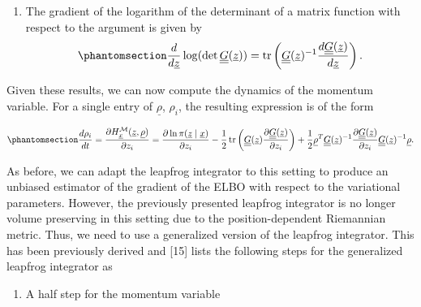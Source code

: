 \documentclass[
]{scrartcl}
\providecommand{\tightlist}{%
  \setlength{\itemsep}{0pt}\setlength{\parskip}{0pt}}
\begin{document}
\begin{refsection}
\begin{enumerate}
\def\labelenumi{\arabic{enumi}.}
\setcounter{enumi}{2}
\tightlist
\item
  The gradient of the logarithm of the determinant of a matrix function
  with respect to the argument is given by
  \begin{equation}\phantomsection\label{eq-gradient-log-determinant-matrix}{  
  \frac{d}{d \underline{z}} 
  \log (\operatorname{det} \underline{\underline{G}}(\underline{z})) = 
  \operatorname{tr}\left(
   \underline{\underline{G}}(\underline{z})^{-1} 
   \frac{d \underline{\underline{G}}(\underline{z})}{d \underline{z}}
  \right).
  }\end{equation}
\end{enumerate}

Given these results, we can now compute the dynamics of the momentum
variable. For a single entry of \(\underline{\rho}\), \(\rho_i\), the
resulting expression is of the form

\begin{equation}\phantomsection\label{eq-gradient-hamiltonian-momentum-rhmc}{
\frac{d \rho_i}{d t} = 
\frac{
    \partial H_{\underline{x}}^{\mathcal{M}}(\underline{z}, \underline{\rho})
}{
    \partial z_i
} = 
\frac{\partial \ln \pi(\underline{z} \mid \underline{x})}{\partial z_i} -
\frac{1}{2} \operatorname{tr}\left(
    \underline{\underline{G}}(\underline{z}) 
    \frac{\partial \underline{\underline{G}}(\underline{z})}{\partial z_i}
\right) +
\frac{1}{2} 
\underline{\rho}^T 
\underline{\underline{G}}(\underline{z})^{-1} 
\frac{\partial \underline{\underline{G}}(\underline{z})}{\partial z_i} 
\underline{\underline{G}}(\underline{z})^{-1} \underline{\rho}.
}\end{equation}

As before, we can adapt the leapfrog integrator to this setting to
produce an unbiased estimator of the gradient of the ELBO with respect
to the variational parameters. However, the previously presented
leapfrog integrator is no longer volume preserving in this setting due
to the position-dependent Riemannian metric. Thus, we need to use a
generalized version of the leapfrog integrator. This has been previously
derived and {[}15{]} lists the following steps for the generalized
leapfrog integrator as

\begin{enumerate}
\def\labelenumi{\arabic{enumi}.}
\tightlist
\item
  A half step for the momentum variable
\end{enumerate}


\end{refsection}
\end{document}
